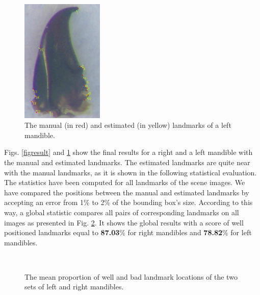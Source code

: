 \documentclass[twoside,twocolumn,10pt]{article}
\begin{document}
\begin{figure}[htbp]
\centering
\includegraphics[width=0.35\textwidth]{./images/mg_rs}
\caption{The manual (in red) and estimated (in yellow) landmarks of a left mandible.}
\label{figresult2}
\end{figure}

Figs. \ref{figresult} and \ref{figresult2} show the final results
for a right and a left mandible with the manual and estimated
landmarks. The estimated landmarks are quite near with the manual
landmarks, as it is shown in the following statistical evaluation.
\\
The statistics have been computed for all landmarks of the scene images.
We have compared the positions between the manual and estimated
landmarks by accepting an error from 1\% to 2\% of the bounding box's
size. According to this way, a global statistic compares all pairs of
corresponding landmarks on all images as presented in
Fig. \ref{figctresult}. It shows the global results with a score of
well positioned landmarks equal to \textbf{87.03}\% for right
mandibles and \textbf{78.82}\% for left mandibles.

\begin{figure}[htbp]
\centering
{}~~
\caption{The mean proportion of well and bad landmark locations of the two sets of left and right mandibles.}
\label{figctresult}
\end{figure}
\end{document}
